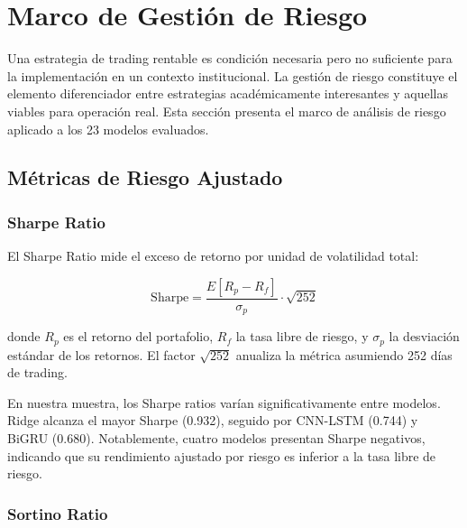 
\section{Marco de Gesti\'on de Riesgo}
\label{sec:risk_management}

Una estrategia de trading rentable es condici\'on necesaria pero no suficiente para la implementaci\'on en un contexto institucional. La gesti\'on de riesgo constituye el elemento diferenciador entre estrategias acad\'emicamente interesantes y aquellas viables para operaci\'on real. Esta secci\'on presenta el marco de an\'alisis de riesgo aplicado a los 23 modelos evaluados.

\subsection{M\'etricas de Riesgo Ajustado}
\label{subsec:risk_adjusted_metrics}

\subsubsection{Sharpe Ratio}

El Sharpe Ratio \citep{sharpe1966mutual} mide el exceso de retorno por unidad de volatilidad total:

\begin{equation}
\text{Sharpe} = \frac{E[R_p - R_f]}{\sigma_p} \cdot \sqrt{252}
\label{eq:sharpe}
\end{equation}

donde $R_p$ es el retorno del portafolio, $R_f$ la tasa libre de riesgo, y $\sigma_p$ la desviaci\'on est\'andar de los retornos. El factor $\sqrt{252}$ anualiza la m\'etrica asumiendo 252 d\'ias de trading.

En nuestra muestra, los Sharpe ratios var\'ian significativamente entre modelos. Ridge alcanza el mayor Sharpe (0.932), seguido por CNN-LSTM (0.744) y BiGRU (0.680). Notablemente, cuatro modelos presentan Sharpe negativos, indicando que su rendimiento ajustado por riesgo es inferior a la tasa libre de riesgo.

\subsubsection{Sortino Ratio}

